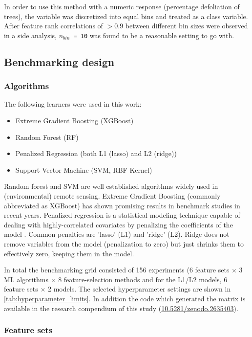 \documentclass[journal]{IEEEtran}
\begin{document}
In order to use this method with a numeric response (percentage defoliation of trees), the variable was discretized into equal bins and treated as a class variable.
After feature rank correlations of $> 0.9$ between different bin sizes were observed in a side analysis, \texttt{\(n_{bin}\) = 10} was found to be a reasonable setting to go with.

\subsection{Benchmarking design}

\subsubsection{Algorithms}

The following learners were used in this work:

\begin{itemize}
	\item  Extreme Gradient Boosting (XGBoost)
	\item  Random Forest (RF)
	\item  Penalized Regression (both L1 (lasso) and L2 (ridge))
	\item  Support Vector Machine (SVM, RBF Kernel)
\end{itemize}

Random forest and {SVM} are well established algorithms widely used in (environmental) remote sensing.
Extreme Gradient Boosting (commonly abbreviated as XGBoost) has shown promising results in benchmark studies in recent years.
Penalized regression is a statistical modeling technique capable of dealing with highly-correlated covariates by penalizing the coefficients of the model \cite{hastie2001}.
Common penalties are 'lasso' (L1) and 'ridge' (L2).
Ridge does not remove variables from the model (penalization to zero) but just shrinks them to effectively zero, keeping them in the model.

In total the benchmarking grid consisted of 156 experiments (6 feature sets $\times$ 3 ML algorithms $\times$ 8 feature-selection methods and for the L1/L2 models, 6 feature sets $\times$ 2 models.
The selected hyperparameter settings are shown in \autoref{tab:hyperparameter_limits}.
In addition the code which generated the matrix is available in the research compendium of this study (\url{10.5281/zenodo.2635403}).

\subsubsection{Feature sets}
\end{document}
